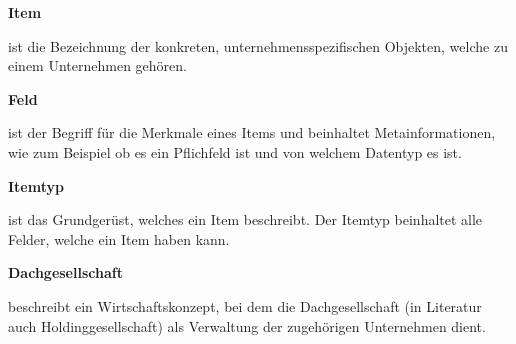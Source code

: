 \documentclass[11pt,a4paper]{report}
\begin{document}
\textbf{Item}
\par
\begingroup
\leftskip=1cm
\noindent ist die Bezeichnung der konkreten, unternehmensspezifischen Objekten, welche zu einem Unternehmen gehören.\\
\par
\endgroup

\textbf{Feld}
\par
\begingroup
\leftskip=1cm
\noindent ist der Begriff für die Merkmale eines Items und beinhaltet Metainformationen,
wie zum Beispiel ob es ein Pflichfeld ist und von welchem Datentyp es ist.\\
\par
\endgroup

\textbf{Itemtyp}
\par
\begingroup
\leftskip=1cm
\noindent ist das Grundgerüst, welches ein Item beschreibt.
Der Itemtyp beinhaltet alle Felder, welche ein Item haben kann.\\
\par
\endgroup

\textbf{Dachgesellschaft}
\par
\begingroup
\leftskip=1cm
\noindent beschreibt ein Wirtschaftskonzept, bei dem die Dachgesellschaft (in Literatur auch Holdinggesellschaft) als Verwaltung der zugehörigen Unternehmen dient.\\
\par
\endgroup
\end{document}

